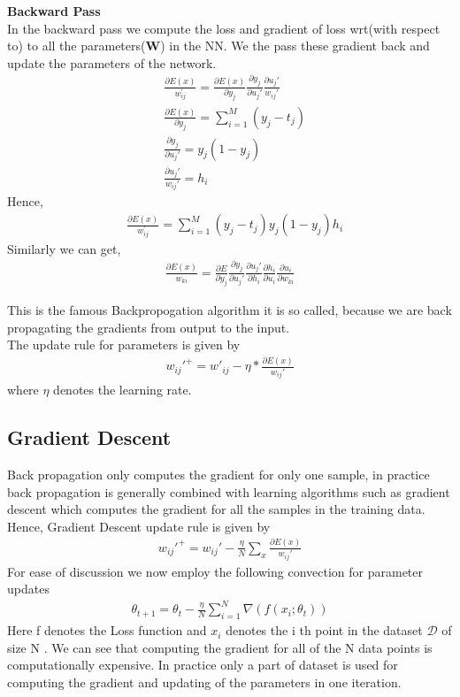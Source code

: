 \documentclass[a4paper,twoside]{iiththesis}
\theoremstyle{definition}
\theoremstyle{definition}
\theoremstyle{remark}
\begin{document}
\newpage
\textbf{Backward Pass}\\
In the backward pass we compute the loss and gradient of loss wrt(with respect to) to all the parameters($\mathbf{W}$) in the NN. We the pass these gradient back and update the parameters of the network.
\begin{align}
&\frac{\partial E(x) }{w_{ij}^{'}} = \frac{\partial E(x)}{\partial{y_j}} \frac{\partial{y_j}}{\partial{u_{j}'}}\frac{\partial u_{j}'}{w_{ij}'}\\
&\frac{\partial E(x)}{\partial{y_j}} = \sum_{i=1}^M (y_{j} - t_{j}) \\
&\frac{\partial{y_j}}{\partial{u_{j}'}} = y_j (1-y_j) \\
&\frac{\partial u_{j}'}{w_{ij}'} = h_i
\end{align}
Hence, 
\begin{align}
&\frac{\partial E (x)}{w_{ij}^{'}} = \sum_{i=1}^M (y_j - t_j) y_j (1 - y_j) h_i
\end{align}
Similarly we can get, \begin{align}
\frac{\partial E(x)}{w_{ki}} = \frac{\partial E}{\partial y_j}\frac{\partial y_j}{\partial u_{j}'}\frac{\partial u_{j}'}{\partial h_i}\frac{\partial h_i}{\partial u_i}\frac{\partial u_i}{\partial w_{ki}}
\end{align}

This is the famous Backpropogation algorithm it is so called, because we are back propagating the gradients from output to the input.\\
The update rule for parameters  is given by 
\begin{align}
w_{ij}'^{+} = w'_{ij} - \eta * \frac{\partial E(x) }{w_{ij}'}
\end{align}
where $\eta$ denotes the learning rate. \\
\subsection{Gradient Descent }
Back propagation only computes the gradient for only one sample, in practice back propagation is generally combined with learning algorithms such as gradient descent which computes the gradient for all the samples in the training data. Hence, Gradient Descent update rule is given by 
\begin{align}
w_{ij}'^+ = w_{ij}' - \frac{\eta}{N} \sum_{x}  \frac{\partial E(x) }{w_{ij}'}
\end{align}
For ease of discussion we now employ the following convection for parameter updates 
\begin{align}
\theta_{t+1} = \theta_{t} - \frac{\eta}{N} \sum_{i=1}^N \nabla(f(x_i; \theta_t))
\end{align}
Here f denotes the Loss function and $x_i$ denotes the i th point in the dataset $\mathcal{D}$ of size N . We can see that computing the gradient  for all of the N data points is computationally expensive. In practice only a part of dataset is used for computing the gradient and  updating of the parameters in one iteration. \\
\end{document}
